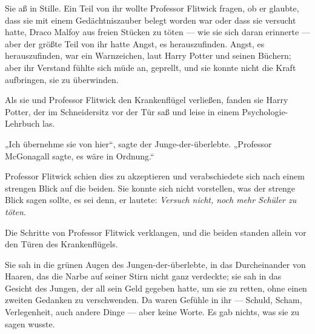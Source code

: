 Sie aß in Stille. Ein Teil von ihr wollte Professor Flitwick fragen, ob er glaubte, dass sie mit einem Gedächtniszauber belegt worden war oder dass sie versucht hatte, Draco Malfoy aus freien Stücken zu töten — wie sie sich daran erinnerte — aber der größte Teil von ihr hatte Angst, es herauszufinden. Angst, es herauszufinden, war ein Warnzeichen, laut Harry Potter und seinen Büchern; aber ihr Verstand fühlte sich müde an, geprellt, und sie konnte nicht die Kraft aufbringen, sie zu überwinden.

Als sie und Professor Flitwick den Krankenflügel verließen, fanden sie Harry Potter, der im Schneidersitz vor der Tür saß und leise in einem Psychologie-Lehrbuch las.

„Ich übernehme sie von hier“, sagte der Junge-der-überlebte.
„Professor McGonagall sagte, es wäre in Ordnung.“

Professor Flitwick schien dies zu akzeptieren und verabschiedete sich nach einem strengen Blick auf die beiden. Sie konnte sich nicht vorstellen, was der strenge Blick sagen sollte, es sei denn, er lautete: \emph{Versuch nicht, noch mehr Schüler zu töten.}

Die Schritte von Professor Flitwick verklangen, und die beiden standen allein vor den Türen des Krankenflügels.

Sie sah in die grünen Augen des Jungen-der-überlebte, in das Durcheinander von Haaren, das die Narbe auf seiner Stirn nicht ganz verdeckte; sie sah in das Gesicht des Jungen, der all sein Geld gegeben hatte, um sie zu retten, ohne einen zweiten Gedanken zu verschwenden. Da waren Gefühle in ihr — Schuld, Scham, Verlegenheit, auch andere Dinge — aber keine Worte. Es gab nichts, was sie zu sagen wusste.

